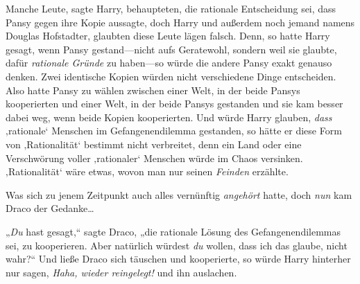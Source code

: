 Manche Leute, sagte Harry, behaupteten, die rationale Entscheidung sei, dass Pansy gegen ihre Kopie aussagte, doch Harry und außerdem noch jemand namens Douglas Hofstadter, glaubten diese Leute lägen falsch. Denn, so hatte Harry gesagt, wenn Pansy gestand—nicht aufs Geratewohl, sondern weil sie glaubte, dafür \emph{rationale Gründe} zu haben—so würde die andere Pansy exakt genauso denken. Zwei identische Kopien würden nicht verschiedene Dinge entscheiden. Also hatte Pansy zu wählen zwischen einer Welt, in der beide Pansys kooperierten und einer Welt, in der beide Pansys gestanden und sie kam besser dabei weg, wenn beide Kopien kooperierten. Und würde Harry glauben, \emph{dass} ‚rationale‘ Menschen im Gefangenendilemma gestanden, so hätte er diese Form von ‚Rationalität‘ bestimmt nicht verbreitet, denn ein Land oder eine Verschwörung voller ‚rationaler‘ Menschen würde im Chaos versinken. ‚Rationalität‘ wäre etwas, wovon man nur seinen \emph{Feinden} erzählte.

Was sich zu jenem Zeitpunkt auch alles vernünftig \emph{angehört} hatte, doch \emph{nun} kam Draco der Gedanke…

„\emph{Du} hast gesagt,“ sagte Draco, „die rationale Lösung des Gefangenendilemmas sei, zu kooperieren. Aber natürlich würdest \emph{du} wollen, dass ich das glaube, nicht wahr?“ Und ließe Draco sich täuschen und kooperierte, so würde Harry hinterher nur sagen, \emph{Haha, wieder reingelegt!} und ihn auslachen.

